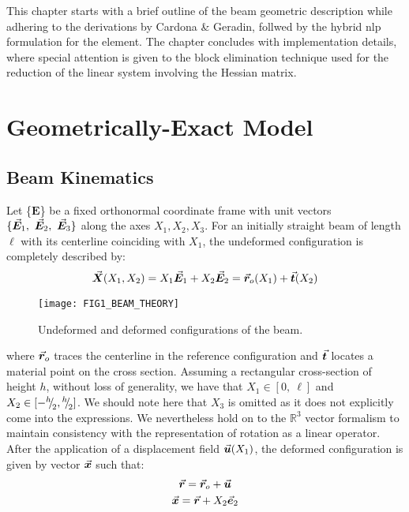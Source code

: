 This chapter starts with a brief outline of the beam geometric description 
while adhering to the derivations by Cardona \& Geradin\cite{Cardona}, follwed 
by the hybrid \acrshort{nlp} formulation for the element. The chapter concludes 
with implementation details, where special attention is given to the block 
elimination technique used for the reduction of the linear system involving the 
Hessian matrix. 

\section{Geometrically-Exact Model}\label{section:CH2-S2}

\subsection{Beam Kinematics}\label{subsection:CH2-S2SS1}
Let \{$\mathbf{E}$\} be a fixed orthonormal coordinate frame with unit vectors
$\{\vec{\boldsymbol{E}}_1,\ \vec{\boldsymbol{E}}_2,\ \vec{\boldsymbol{E}}_3\}$ along the axes $X_1, X_2, X_3$. For
an initially straight beam of length $\ell$ with its centerline coinciding with
$X_1$, the undeformed configuration is completely described by:
\begin{gather}
	\vec{\boldsymbol{X}}(X_1,X_2) = X_1\vec{\boldsymbol{E}}_1 + X_2\vec{\boldsymbol{E}}_2 =
	\vec{\boldsymbol{r}}_o(X_1)+\vec{\boldsymbol{t}}(X_2)
\end{gather}

\begin{figure}[t]
	\centering
	\texttt{[image: FIG1\_BEAM\_THEORY]}
	\caption{Undeformed and deformed configurations of the beam.}
	\label{fig:FIG1}
\end{figure}

\noindent where $\vec{\boldsymbol{r}}_o$ traces the centerline in the reference 
configuration
and $\vec{\boldsymbol{t}}$ locates a material point on the cross section. Assuming a
rectangular cross-section of height $h$, without loss of generality, we have 
that
$X_1\in[0,\ \ell]$ and $X_2\in[-{}^h{\mskip -5mu/\mskip -3mu}_2, {}^h{\mskip -5mu/\mskip -3mu}_2]$. We should
note here that $X_3$ is omitted as it does not explicitly come into the
expressions. We nevertheless hold on to the $\mathbb{R}^3$ vector formalism to
maintain consistency with the representation of rotation as a linear operator.
After the application of a displacement field $\vec{\boldsymbol{u}}(X_1)$, the
deformed configuration is given by vector $\vec{\boldsymbol{x}}$ such that:
\begin{gather}
	\vec{\boldsymbol{r}} = \vec{\boldsymbol{r}}_o + \vec{\boldsymbol{u}} \label{eq:def1}\\
	\vec{\boldsymbol{x}}=\vec{\boldsymbol{r}} + X_2\vec{\boldsymbol{e}}_2 \label{eq:deformed}
\end{gather}


